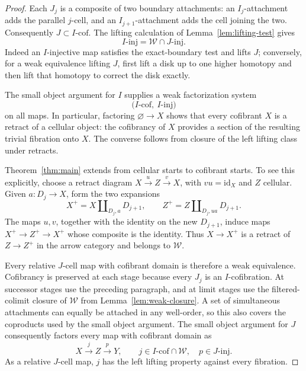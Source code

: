 \documentclass[11pt,letterpaper]{article}
\numberwithin{equation}{section}
\theoremstyle{plain}
\theoremstyle{definition}
\theoremstyle{remark}
\begin{document}
\begin{proof}
Each \(J_j\) is a composite of two boundary attachments: an
\(I_j\)-attachment adds the parallel \(j\)-cell, and an
\(I_{j+1}\)-attachment adds the cell joining the two.  Consequently
\(J\subset I\text{-}\mathrm{cof}\).  The lifting calculation of
Lemma~\ref{lem:lifting-test} gives
\begin{equation}\label{eq:consequences-trivial-fibrations}
 I\text{-}\mathrm{inj}
   =\mathcal W\cap J\text{-}\mathrm{inj}.
\end{equation}
Indeed an \(I\)-injective map satisfies the exact-boundary test and
lifts \(J\); conversely, for a weak equivalence lifting \(J\), first
lift a disk up to one higher homotopy and then lift that homotopy to
correct the disk exactly.

The small object argument for \(I\) supplies a weak factorization
system
\[
 \bigl(I\text{-}\mathrm{cof},\ I\text{-}\mathrm{inj}\bigr)
\]
on all maps.  In particular, factoring \(\varnothing\to X\) shows
that every cofibrant \(X\) is a retract of a cellular object: the
cofibrancy of \(X\) provides a section of the resulting trivial
fibration onto \(X\).  The converse follows from closure of the left
lifting class under retracts.

Theorem~\ref{thm:main} extends from cellular starts to cofibrant starts.
To see this explicitly, choose a retract diagram
\(X\xrightarrow{u}Z\xrightarrow{v}X\), with \(vu=\mathrm{id}_X\) and
\(Z\) cellular.  Given \(a:D_j\to X\), form the two expansions
\[
 X^+=X\amalg_{D_j,a}D_{j+1},
 \qquad
 Z^+=Z\amalg_{D_j,ua}D_{j+1}.
\]
The maps \(u,v\), together with the identity on the new
\(D_{j+1}\), induce maps \(X^+\to Z^+\to X^+\) whose composite
is the identity.  Thus \(X\to X^+\) is a retract of \(Z\to Z^+\)
in the arrow category and belongs to \(\mathcal W\).

Every relative \(J\)-cell map with cofibrant domain is therefore a
weak equivalence.  Cofibrancy is preserved at each stage because every
\(J_j\) is an \(I\)-cofibration.  At successor stages use the
preceding paragraph, and at limit stages use the filtered-colimit
closure of \(\mathcal W\) from Lemma~\ref{lem:weak-closure}.
A set of simultaneous attachments can equally be attached in any
well-order, so this also covers the coproducts used by the small object
argument.  The small object argument for \(J\) consequently factors
every map with cofibrant domain as
\[
 X\xrightarrow{j}Z\xrightarrow{p}Y,
 \qquad
 j\in I\text{-}\mathrm{cof}\cap\mathcal W,
 \quad p\in J\text{-}\mathrm{inj}.
\]
As a relative \(J\)-cell map, \(j\) has the left lifting property
against every fibration.


\end{proof}
\end{document}
